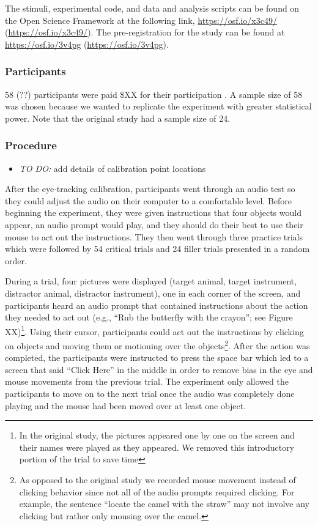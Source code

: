 \documentclass[
  man,floatsintext]{apa6}
\providecommand{\tightlist}{%
  \setlength{\itemsep}{0pt}\setlength{\parskip}{0pt}}
\begin{document}
The stimuli, experimental code, and data and analysis scripts can be found on the Open Science Framework at the following link, \url{https://osf.io/x3c49/} (\url{https://osf.io/x3c49/}). The pre-registration for the study can be found at \url{https://osf.io/3v4pg} (\url{https://osf.io/3v4pg}).

\hypertarget{participants-4}{%
\subsubsection{Participants}\label{participants-4}}

58 (??) participants were paid \$XX for their participation . A sample size of 58 was chosen because we wanted to replicate the experiment with greater statistical power. Note that the original study had a sample size of 24.

\hypertarget{procedure-3}{%
\subsubsection{Procedure}\label{procedure-3}}

\begin{itemize}
\tightlist
\item
  \emph{TO DO:} add details of calibration point locations
\end{itemize}

After the eye-tracking calibration, participants went through an audio test so they could adjust the audio on their computer to a comfortable level. Before beginning the experiment, they were given instructions that four objects would appear, an audio prompt would play, and they should do their best to use their mouse to act out the instructions. They then went through three practice trials which were followed by 54 critical trials and 24 filler trials presented in a random order.

During a trial, four pictures were displayed (target animal, target instrument, distractor animal, distractor instrument), one in each corner of the screen, and participants heard an audio prompt that contained instructions about the action they needed to act out (e.g., ``Rub the butterfly with the crayon''; see Figure XX)\footnote{In the original study, the pictures appeared one by one on the screen and their names were played as they appeared. We removed this introductory portion of the trial to save time}. Using their cursor, participants could act out the instructions by clicking on objects and moving them or motioning over the objects\footnote{ As opposed to the original study we recorded mouse movement instead of clicking behavior since not all of the audio prompts required clicking. For example, the sentence ``locate the camel with the straw'' may not involve any clicking but rather only mousing over the camel.}. After the action was completed, the participants were instructed to press the space bar which led to a screen that said ``Click Here'' in the middle in order to remove bias in the eye and mouse movements from the previous trial. The experiment only allowed the participants to move on to the next trial once the audio was completely done playing and the mouse had been moved over at least one object.
\end{document}
